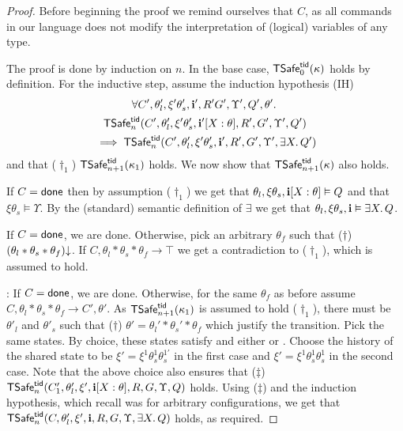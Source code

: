 \begin{proof}
Before beginning the proof we remind ourselves that $C$, as all commands in our language
does not modify the interpretation of (logical) variables of any type.

The proof is done by induction on $n$.
In the base case, ${\sf TSafe}^{{\sf tid}}_0(\kappa)$ holds by definition.
For the inductive step, 
assume 
the induction hypothesis (IH)  
\begin{multline*}
  \forall C',\theta'_l,\xi'\theta'_s,{\bf i}',R'G',\Upsilon', Q', \theta'.\,
  \\
  {\sf TSafe}^{{\sf tid}}_n(C', \theta'_l,\xi'\theta'_s,{\bf i}'[X:\theta],R',G',\Upsilon', Q') 
  \\
   \mbox{} \implies  {\sf TSafe}^{{\sf tid}}_n(C',\theta'_l,\xi'\theta'_s,{\bf i}',R',G',\Upsilon',\exists X.\,Q')   
\end{multline*}
and that ($\dagger_1$) ${\sf TSafe}^{{\sf tid}}_{n+1}(\kappa_1)$ holds.
We now show that ${\sf TSafe}^{{\sf tid}}_{n+1}(\kappa)$ also holds.

If $C = {\sf done}$ then by assumption ($\dagger_1$) we get that 
$\theta_l,\xi\theta_s,{\bf i}[X:\theta] \vDash Q$
and that $\xi\theta_s \vDash \Upsilon$.
By the (standard) semantic definition of $\exists$ we get that 
$\theta_l,\xi\theta_s,{\bf i} \vDash \exists X.\,Q$. 

If $C={\sf done}$, we are done.
Otherwise, 
pick an arbitrary $\theta_f$ such that ($\dagger$) 
$(\theta_l*\theta_s*\theta_f)\mathpunct{\downarrow}$.
If $C,\theta_l*\theta_s*\theta_f \rightarrow \top$   we get a contradiction to ($\dagger_1$),
which is  assumed to hold.

: 
If $C={\sf done}$, we are done.
Otherwise, 
for the same $\theta_f$ as before
assume $C, \theta_l*\theta_s*\theta_f \rightarrow C',\theta'$. 
As ${\sf TSafe}^{{\sf tid}}_{n+1}(\kappa_1)$ is assumed to hold ($\dag_1$), 
there must be 
$\theta'_l$  and $\theta'_s$ such that ($\dag$) $\theta' = \theta_l' * \theta_s' * \theta_f$ 
which justify the transition.
Pick the same   states.
By choice, these states satisfy  and either  
 or .
Choose the  history of the shared state to be  
$\xi'=\xi^1\theta^1_s\theta^{1'}_s$  in the first case and $\xi'=\xi^1\theta^1_s\theta^1_s$ in the second case.
Note that the above choice also ensures that ($\ddag$)  
${\sf TSafe}^{{\sf tid}}_n(C'_1, \theta'_l,\xi',{\bf i}[X:\theta],R,G,\Upsilon, Q)$ holds.
Using ($\ddag$) and the induction hypothesis, which recall was for arbitrary configurations,
we get that 
${\sf TSafe}^{{\sf tid}}_n(C, \theta'_l,\xi',{\bf i},R,G,\Upsilon, \exists X.\,Q)$ holds, as required.



\end{proof}
